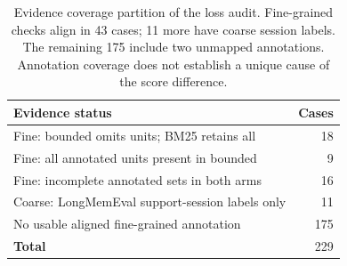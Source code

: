 \begin{table}[htbp]
\centering
\small
\setlength{\tabcolsep}{4pt}
\caption{Evidence coverage partition of the loss audit. Fine-grained checks align in 43 cases; 11 more have coarse session labels. The remaining 175 include two unmapped annotations. Annotation coverage does not establish a unique cause of the score difference.}
\label{tab:evidence}
\begin{tabular}{lr}
\toprule
Evidence status & Cases \\
\midrule
Fine: bounded omits units; BM25 retains all & 18 \\
Fine: all annotated units present in bounded & 9 \\
Fine: incomplete annotated sets in both arms & 16 \\
Coarse: LongMemEval support-session labels only & 11 \\
No usable aligned fine-grained annotation & 175 \\
\textbf{Total} & 229 \\
\bottomrule
\end{tabular}
\end{table}
